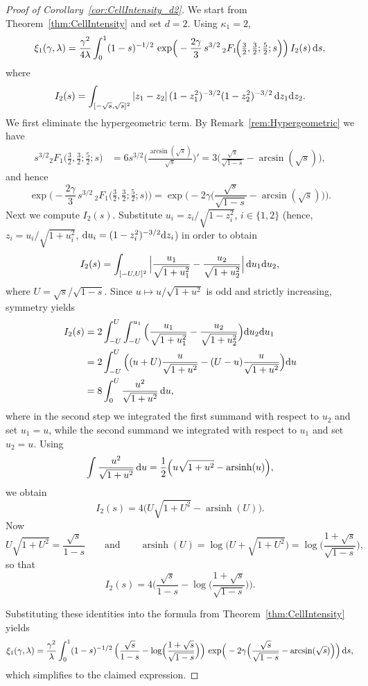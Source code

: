\documentclass[11pt,a4paper]{article}
\theoremstyle{plain}
\theoremstyle{definition}
\theoremstyle{remark}
\newcommand{\dint}{\textup{d}}
\begin{document}
\begin{proof}[Proof of Corollary~\ref{cor:CellIntensity_d2}]
	We start from Theorem~\ref{thm:CellIntensity} and set $d=2$. Using $\kappa_1=2$,
	\[
		\xi_1(\gamma,\lambda)
		=\frac{\gamma^2}{4\lambda}
		\int_0^1 (1-s)^{-1/2}\,
		\exp\!\Big(
		-\frac{2\gamma}{3}\,
		s^{3/2}\,
		{}_2F_1\!\Big(\tfrac32,\tfrac32;\tfrac52;s\Big)
		\Big)\,I_2(s)\,\dint s,
	\]
	where
	\[
		I_2(s)=\int_{[-\sqrt{s},\sqrt{s}]^2}|z_1-z_2|\,(1-z_1^2)^{-3/2}(1-z_2^2)^{-3/2}\,\dint z_1\dint z_2.
	\]
	We first eliminate the hypergeometric term. By Remark~\ref{rem:Hypergeometric} we have
	\begin{align*}
		s^{3/2}{}_2F_1\!\Big(\tfrac32,\tfrac32;\tfrac52;s\Big)
		 & =6s^{3/2}\Big(\frac{\arcsin(\sqrt{s})}{\sqrt{s}}\Big)'=3\Big(\frac{\sqrt{s}}{\sqrt{1-s}}-\arcsin(\sqrt{s})\Big),
	\end{align*}
	and hence
	\[
		\exp\!\Big(
		-\frac{2\gamma}{3}\,
		s^{3/2}\,
		{}_2F_1\!\Big(\tfrac32,\tfrac32;\tfrac52;s\Big)
		\Big)
		=
		\exp\!\Big(
		-2\gamma\Big(\frac{\sqrt{s}}{\sqrt{1-s}}-\arcsin(\sqrt{s})\Big)
		\Big).
	\]
	Next we compute $I_2(s)$. Substitute $u_i=z_i/\sqrt{1-z_i^2}$, $i\in\{1,2\}$ (hence, $z_i=u_i/\sqrt{1+u_i^2}$, $\dint u_i=(1-z_i^2)^{-3/2}\dint z_i$) in order to obtain
	\[
		I_2(s)=\int_{[-U,U]^2}\Big|\frac{u_1}{\sqrt{1+u_1^2}}-\frac{u_2}{\sqrt{1+u_2^2}}\Big|\,\dint u_1\dint u_2,
	\]
	where $U=\sqrt{s}/\sqrt{1-s}$.
	Since $u\mapsto u/\sqrt{1+u^2}$ is odd and strictly increasing, symmetry yields
	\begin{align*}
		I_2(s) & =2\int_{-U}^U\int_{-U}^{u_1}\Big(\frac{u_1}{\sqrt{1+u_1^2}}-\frac{u_2}{\sqrt{1+u_2^2}}\Big)\dint u_2\dint u_1 \\
		       & =2\int_{-U}^U\Big((u+U)\frac{u}{\sqrt{1+u^2}}-(U-u)\frac{u}{\sqrt{1+u^2}}\Big)\dint u                         \\
		       & =8\int_0^U \frac{u^2}{\sqrt{1+u^2}}\,\dint u,
	\end{align*}
	where in the second step we integrated the first summand with respect to $u_2$ and set $u_1=u$, while the second summand we integrated with respect to $u_1$ and set $u_2=u$. Using
	\[
		\int \frac{u^2}{\sqrt{1+u^2}}\,\dint u
		=\frac12\Big(u\sqrt{1+u^2}-\operatorname{arsinh}(u)\Big),
	\]
	we obtain
	\[
		I_2(s)=4\Big(U\sqrt{1+U^2}-\operatorname{arsinh}(U)\Big).
	\]
	Now 
	\[
		U\sqrt{1+U^2}=\frac{\sqrt{s}}{1-s}
        \qquad\text{and}\qquad
        \operatorname{arsinh}(U)=\log\!\big(U+\sqrt{1+U^2}\big)
		=\log\!\Big(\frac{1+\sqrt{s}}{\sqrt{1-s}}\Big),
	\]
	so that
	\[
		I_2(s)=4\Big(\frac{\sqrt{s}}{1-s}-\log\!\Big(\frac{1+\sqrt{s}}{\sqrt{1-s}}\Big)\Big).
	\]

	\medskip

	Substituting these identities into the formula from Theorem~\ref{thm:CellIntensity}
	yields
	\[
		\xi_1(\gamma,\lambda)
		=\frac{\gamma^2}{\lambda}
		\int_0^1 (1-s)^{-1/2}\,
		\Big(\frac{\sqrt{s}}{1-s}-\log\!\Big(\frac{1+\sqrt{s}}{\sqrt{1-s}}\Big)\Big)\,
		\exp\!\Big(
		-2\gamma\Big(\frac{\sqrt{s}}{\sqrt{1-s}}-\arcsin(\sqrt{s})\Big)
		\Big)\,\dint s,
	\]
	which simplifies to the claimed expression.
\end{proof}
\end{document}
